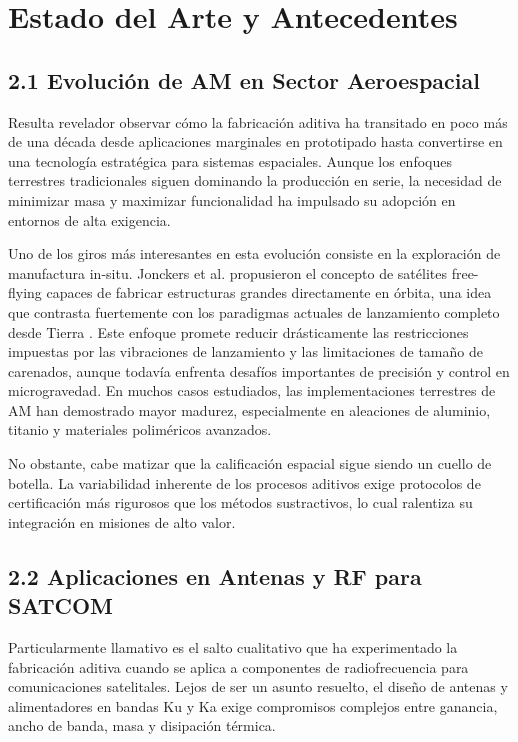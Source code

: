 \section{Estado del Arte y Antecedentes}

\subsection{2.1 Evolución de AM en Sector Aeroespacial}

Resulta revelador observar cómo la fabricación aditiva ha transitado en poco más de una década desde aplicaciones marginales en prototipado hasta convertirse en una tecnología estratégica para sistemas espaciales. Aunque los enfoques terrestres tradicionales siguen dominando la producción en serie, la necesidad de minimizar masa y maximizar funcionalidad ha impulsado su adopción en entornos de alta exigencia.

Uno de los giros más interesantes en esta evolución consiste en la exploración de manufactura in-situ. Jonckers et al. propusieron el concepto de satélites free-flying capaces de fabricar estructuras grandes directamente en órbita, una idea que contrasta fuertemente con los paradigmas actuales de lanzamiento completo desde Tierra \cite{Jonckers2022}. Este enfoque promete reducir drásticamente las restricciones impuestas por las vibraciones de lanzamiento y las limitaciones de tamaño de carenados, aunque todavía enfrenta desafíos importantes de precisión y control en microgravedad. En muchos casos estudiados, las implementaciones terrestres de AM han demostrado mayor madurez, especialmente en aleaciones de aluminio, titanio y materiales poliméricos avanzados.

No obstante, cabe matizar que la calificación espacial sigue siendo un cuello de botella. La variabilidad inherente de los procesos aditivos exige protocolos de certificación más rigurosos que los métodos sustractivos, lo cual ralentiza su integración en misiones de alto valor.

\subsection{2.2 Aplicaciones en Antenas y RF para SATCOM}

Particularmente llamativo es el salto cualitativo que ha experimentado la fabricación aditiva cuando se aplica a componentes de radiofrecuencia para comunicaciones satelitales. Lejos de ser un asunto resuelto, el diseño de antenas y alimentadores en bandas Ku y Ka exige compromisos complejos entre ganancia, ancho de banda, masa y disipación térmica.

